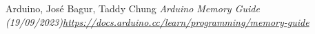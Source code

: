 \documentclass[a4paper, english]{article}
\numberwithin{equation}{section}
\begin{document}
\begin{thebibliography}{1}
Arduino, José Bagur, Taddy Chung \emph{Arduino Memory Guide (19/09/2023)\newline \href{https://docs.arduino.cc/learn/programming/memory-guide}{https://docs.arduino.cc/learn/programming/memory-guide}}
\end{thebibliography}

%
%




%
\end{document}
